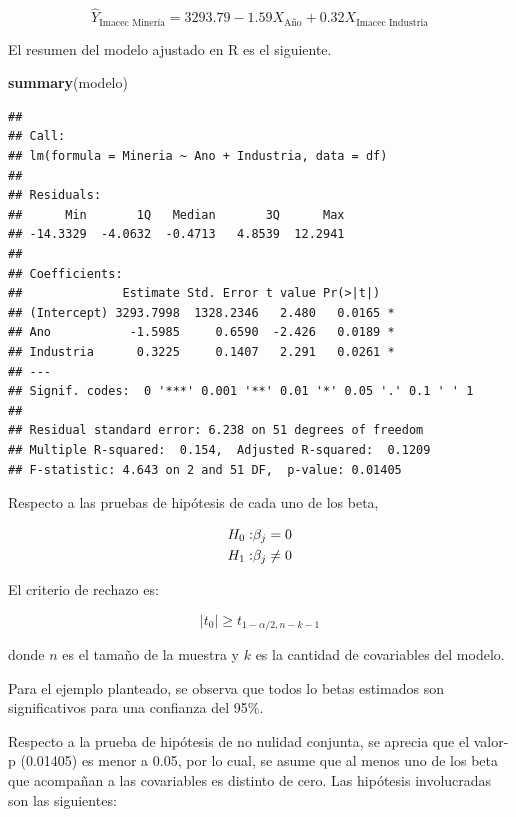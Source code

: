 \documentclass[
  11pt,
]{book}
\newenvironment{Shaded}{\begin{snugshade}}{\end{snugshade}}
\newcommand{\FunctionTok}[1]{\textcolor[rgb]{0.13,0.29,0.53}{\textbf{#1}}}
\newcommand{\NormalTok}[1]{#1}
\theoremstyle{definition}
\theoremstyle{definition}
\theoremstyle{definition}
\theoremstyle{definition}
\theoremstyle{remark}
\begin{document}
\[
\widehat{Y}_{\text{Imacec Minería}} = 3293.79  -1.59X_{\text{Año}} + 0.32X_{\text{Imacec Industria}}
\]

El resumen del modelo ajustado en R es el siguiente.

\begin{Shaded}
\begin{Highlighting}[]
\FunctionTok{summary}\NormalTok{(modelo)}
\end{Highlighting}
\end{Shaded}

\begin{verbatim}
## 
## Call:
## lm(formula = Mineria ~ Ano + Industria, data = df)
## 
## Residuals:
##      Min       1Q   Median       3Q      Max 
## -14.3329  -4.0632  -0.4713   4.8539  12.2941 
## 
## Coefficients:
##              Estimate Std. Error t value Pr(>|t|)  
## (Intercept) 3293.7998  1328.2346   2.480   0.0165 *
## Ano           -1.5985     0.6590  -2.426   0.0189 *
## Industria      0.3225     0.1407   2.291   0.0261 *
## ---
## Signif. codes:  0 '***' 0.001 '**' 0.01 '*' 0.05 '.' 0.1 ' ' 1
## 
## Residual standard error: 6.238 on 51 degrees of freedom
## Multiple R-squared:  0.154,  Adjusted R-squared:  0.1209 
## F-statistic: 4.643 on 2 and 51 DF,  p-value: 0.01405
\end{verbatim}

Respecto a las pruebas de hipótesis de cada uno de los beta,

\begin{equation}
\notag
\begin{split}
H_0:&\beta_j = 0\\
H_1:&\beta_j \neq 0\\
\end{split}
\end{equation}

El criterio de rechazo es:

\begin{equation}
|t_0| \geq t_{1-\alpha/2, n-k-1}
\label{eq:valor-critico-cada-beta-RLM}
\end{equation}

donde \(n\) es el tamaño de la muestra y \(k\) es la cantidad de covariables del modelo.

Para el ejemplo planteado, se observa que todos lo betas estimados son significativos para una confianza del 95\%.

Respecto a la prueba de hipótesis de no nulidad conjunta, se aprecia que el valor-p (0.01405) es menor a 0.05, por lo cual, se asume que al menos uno de los beta que acompañan a las covariables es distinto de cero. Las hipótesis involucradas son las siguientes:
\end{document}
